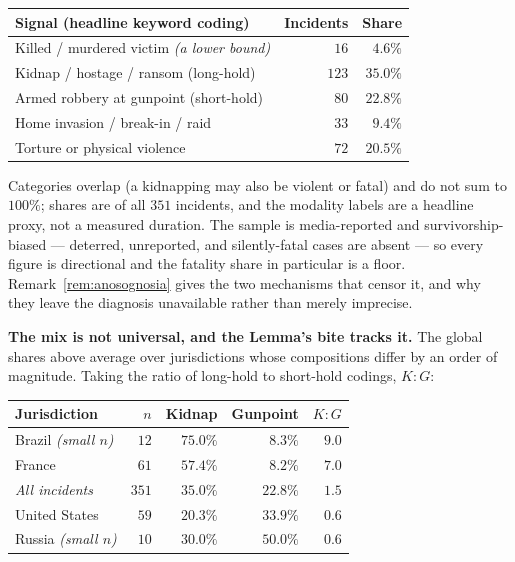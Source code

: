 \begin{center}\small
\begin{tabular}{@{}lrr@{}}
\toprule
\textbf{Signal (headline keyword coding)} & \textbf{Incidents} & \textbf{Share} \\
\midrule
Killed / murdered victim \emph{(a lower bound)} & $16$  & $4.6\%$  \\
Kidnap / hostage / ransom (long-hold)           & $123$ & $35.0\%$ \\
Armed robbery at gunpoint (short-hold)          & $80$  & $22.8\%$ \\
Home invasion / break-in / raid                 & $33$  & $9.4\%$  \\
Torture or physical violence                    & $72$  & $20.5\%$ \\
\bottomrule
\end{tabular}
\end{center}

\noindent Categories overlap (a kidnapping may also be violent or fatal) and do not
sum to $100\%$; shares are of all $351$ incidents, and the modality labels are a
headline proxy, not a measured duration. The sample is media-reported and
survivorship-biased --- deterred, unreported, and silently-fatal cases are absent ---
so every figure is directional and the fatality share in particular is a floor.
Remark~\ref{rem:anosognosia} gives the two mechanisms that censor it, and why they
leave the diagnosis unavailable rather than merely imprecise.

\medskip\noindent\textbf{The mix is not universal, and the Lemma's bite tracks it.} The
global shares above average over jurisdictions whose compositions differ by an order of magnitude.
Taking the ratio of long-hold to short-hold codings, $K{:}G$:

\begin{center}\small
\begin{tabular}{@{}lrrrr@{}}
\toprule
\textbf{Jurisdiction} & \textbf{$n$} & \textbf{Kidnap} & \textbf{Gunpoint} & \textbf{$K{:}G$} \\
\midrule
Brazil \emph{(small $n$)}  & $12$  & $75.0\%$ & $8.3\%$  & $9.0$ \\
France                     & $61$  & $57.4\%$ & $8.2\%$  & $7.0$ \\
\emph{All incidents}       & $351$ & $35.0\%$ & $22.8\%$ & $1.5$ \\
United States              & $59$  & $20.3\%$ & $33.9\%$ & $0.6$ \\
Russia \emph{(small $n$)}  & $10$  & $30.0\%$ & $50.0\%$ & $0.6$ \\
\bottomrule
\end{tabular}
\end{center}

